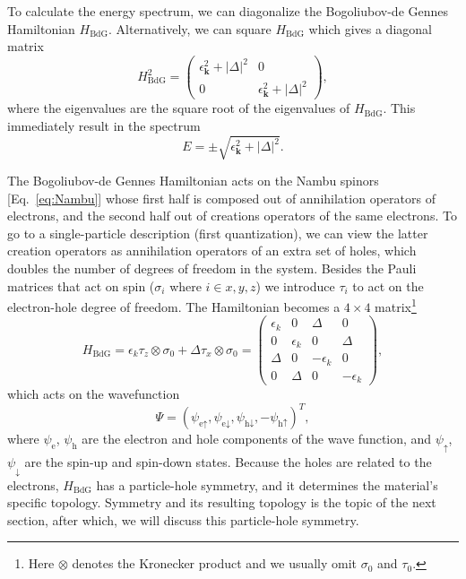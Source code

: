 To calculate the energy spectrum, we can diagonalize the Bogoliubov-de Gennes Hamiltonian $H_{\textrm{BdG}}$.
Alternatively, we can square $H_{\textrm{BdG}}$ which gives a diagonal matrix
\begin{equation}
H_{\textrm{BdG}}^{2}=\left(\begin{array}{cc}
\epsilon_{\bm{k}}^{2}+\left|\Delta\right|^{2} & 0\\
0 & \epsilon_{\bm{k}}^{2}+\left|\Delta\right|^{2}
\end{array}\right),
\end{equation}
where the eigenvalues are the square root of the eigenvalues of $H_{\textrm{BdG}}$.
This immediately result in the spectrum
\begin{equation}
E=\pm\sqrt{\epsilon_{\bm{k}}^{2}+\left|\Delta\right|^{2}}.\label{eq:SC_spectrum}
\end{equation}

The Bogoliubov-de Gennes Hamiltonian acts on the Nambu spinors [Eq.~\eqref{eq:Nambu}] whose first half is composed out of annihilation operators of electrons, and the second half out of creations operators of the same electrons.
To go to a single-particle description (first quantization), we can view the latter creation operators as annihilation operators of an extra set of holes, which doubles the number of degrees of freedom in the system.
Besides the Pauli matrices that act on spin ($\sigma_{i}$ where $i\in x,y,z$) we introduce $\tau_{i}$ to act on the electron-hole degree of freedom.
The Hamiltonian becomes a $4\times4$ matrix\footnote{Here $\otimes$ denotes the Kronecker product and we usually omit $\sigma_{0}$ and $\tau_{0}$.}
\begin{equation}
H_{\textrm{BdG}}=\epsilon_{k}\tau_{z}\otimes\sigma_{0}+\Delta\tau_{x}\otimes\sigma_{0}=\left(\begin{array}{cccc}
\epsilon_{k} & 0 & \Delta & 0\\
0 & \epsilon_{k} & 0 & \Delta\\
\Delta & 0 & -\epsilon_{k} & 0\\
0 & \Delta & 0 & -\epsilon_{k}
\end{array}\right),\label{eq:H_BdG_sc}
\end{equation}
which acts on the wavefunction
\begin{equation}
\Psi=\left(\psi_{\textrm{e}\uparrow},\psi_{\textrm{e}\downarrow},\psi_{\textrm{h}\downarrow},-\psi_{\textrm{h}\uparrow}\right)^{T},\label{eq:4wf}
\end{equation}
where $\psi_{\textrm{e}}$, $\psi_{\textrm{h}}$ are the electron and hole components of the wave function, and $\psi_{\uparrow}$, $\psi_{\downarrow}$ are the spin-up and spin-down states.
Because the holes are related to the electrons, $H_{\textrm{BdG}}$ has a particle-hole symmetry, and it determines the material's specific topology.
Symmetry and its resulting topology is the topic of the next section, after which, we will discuss this particle-hole symmetry.

